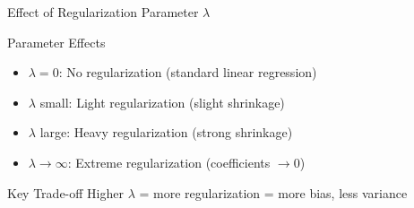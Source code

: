 \documentclass{beamer}
\begin{document}
\begin{frame}{Effect of Regularization Parameter $\lambda$}
\begin{keypointsbox}{Parameter Effects}
\begin{itemize}
\item $\lambda = 0$: No regularization (standard linear regression)
\item $\lambda$ small: Light regularization (slight shrinkage)
\item $\lambda$ large: Heavy regularization (strong shrinkage)
\item $\lambda \to \infty$: Extreme regularization (coefficients $\to 0$)
\end{itemize}
\end{keypointsbox}
\pause

\begin{alertbox}{Key Trade-off}
Higher $\lambda$ = more regularization = more bias, less variance
\end{alertbox}
\end{frame}
\end{document}
